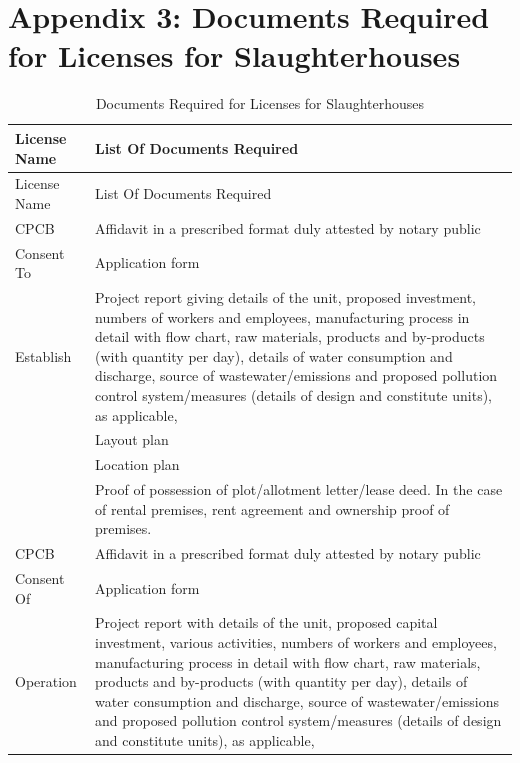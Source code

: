 \documentclass[a4paper, 12pt]{article}
\newcommand\tabitem{\makebox[1em][r]{\textbullet~}}
\begin{document}
\small
\section*{Appendix 3: Documents Required for Licenses for Slaughterhouses}







\begin{longtable}{>{\raggedright}p{2.5cm}>{\raggedright\arraybackslash}p{13cm}}
\caption{Documents Required for Licenses for Slaughterhouses} \\
\toprule
   License Name & List Of Documents Required \\
    \midrule
    \endfirsthead 
     License Name & List Of Documents Required \\
     \midrule
     \endhead
    \endlastfoot
   CPCB  & \tabitem Affidavit in a prescribed format duly attested by notary public \\
   Consent  To  & \tabitem Application form \\
   Establish &  \tabitem Project report giving details of the unit, proposed investment, numbers of workers and employees, manufacturing process in detail with flow chart, raw materials, products and by-products (with quantity per day), details of water consumption and discharge, source of wastewater/emissions and proposed pollution control system/measures (details of design and constitute units), as applicable, \\
          & \tabitem Layout plan \\
          & \tabitem Location plan \\
          & \tabitem Proof of possession of plot/allotment letter/lease deed. In the case of rental premises, rent agreement and ownership proof of premises. \\
    \midrule
    CPCB  & \tabitem Affidavit in a prescribed format duly attested by notary public \\
    Consent Of  & \tabitem Application form \\
   Operation &  \tabitem Project report with details of the unit, proposed capital investment, various activities, numbers of workers and employees, manufacturing process in detail with flow chart, raw materials, products and by-products (with quantity per day), details of water consumption and discharge, source of wastewater/emissions and proposed pollution control system/measures (details of design and constitute units), as applicable, \\

\end{longtable}
\end{document}
